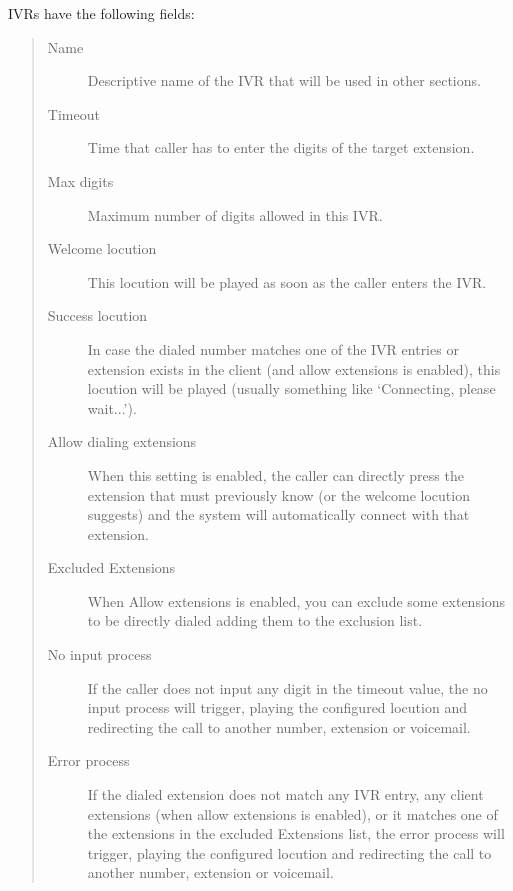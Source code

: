 \documentclass[letterpaper,10pt,spanish]{sphinxmanual}
\begin{document}
IVRs have the following fields:
\begin{quote}
\begin{description}
\item[{Name}] \leavevmode
Descriptive name of the IVR that will be used in other sections.

\item[{Timeout}] \leavevmode
Time that caller has to enter the digits of the target extension.

\item[{Max digits}] \leavevmode
Maximum number of digits allowed in this IVR.

\item[{Welcome locution}] \leavevmode
This locution will be played as soon as the caller enters the IVR.

\item[{Success locution}] \leavevmode
In case the dialed number matches one of the IVR entries or extension
exists in the client (and allow extensions is enabled), this locution
will be played (usually something like `Connecting, please wait...').

\item[{Allow dialing extensions}] \leavevmode
When this setting is enabled, the caller can directly press the extension
that must previously know (or the welcome locution suggests) and the system
will automatically connect with that extension.

\item[{Excluded Extensions}] \leavevmode
When Allow extensions is enabled, you can exclude some extensions to be
directly dialed adding them to the exclusion list.

\item[{No input process}] \leavevmode
If the caller does not input any digit in the timeout value, the
no input process will trigger, playing the configured locution and
redirecting the call to another number, extension or voicemail.

\item[{Error process}] \leavevmode
If the dialed extension does not match any IVR entry, any client extensions
(when allow extensions is enabled), or it matches one of the extensions in the
excluded Extensions list, the error process will trigger, playing the configured
locution and redirecting the call to another number, extension or voicemail.

\end{description}
\end{quote}
\end{document}
